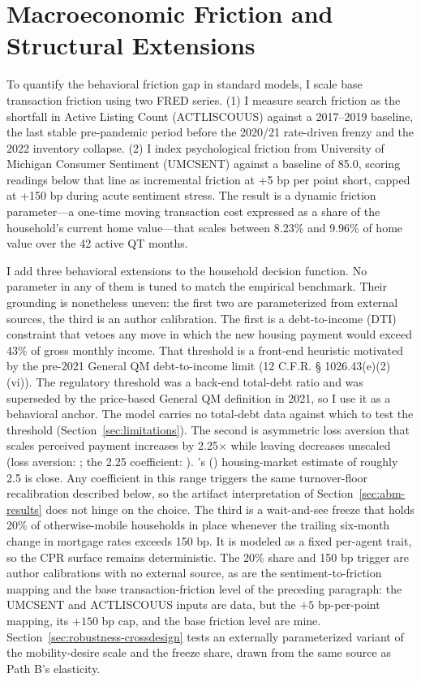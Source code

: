 \documentclass[12pt]{article}
\newcommand{\citepos}[1]{\citeauthor{#1}'s (\citeyear{#1})}
\begin{document}
\section{Macroeconomic Friction and Structural Extensions}\label{sec:method-frictions}

To quantify the behavioral friction gap in standard models, I scale base transaction friction using two FRED series. (1) I measure search friction as the shortfall in Active Listing Count (ACTLISCOUUS) against a 2017--2019 baseline, the last stable pre-pandemic period before the 2020/21 rate-driven frenzy and the 2022 inventory collapse. (2) I index psychological friction from University of Michigan Consumer Sentiment (UMCSENT) against a baseline of 85.0, scoring readings below that line as incremental friction at +5 bp per point short, capped at +150 bp during acute sentiment stress. The result is a dynamic friction parameter---a one-time moving transaction cost expressed as a share of the household's current home value---that scales between 8.23\% and 9.96\% of home value over the 42 active QT months.

I add three behavioral extensions to the household decision function. No parameter in any of them is tuned to match the empirical benchmark. Their grounding is nonetheless uneven: the first two are parameterized from external sources, the third is an author calibration. The first is a debt-to-income (DTI) constraint that vetoes any move in which the new housing payment would exceed 43\% of gross monthly income. That threshold is a front-end heuristic motivated by the pre-2021 General QM debt-to-income limit (12 C.F.R. \S{} 1026.43(e)(2)(vi)). The regulatory threshold was a back-end total-debt ratio and was superseded by the price-based General QM definition in 2021, so I use it as a behavioral anchor. The model carries no total-debt data against which to test the threshold (Section~\ref{sec:limitations}). The second is asymmetric loss aversion that scales perceived payment increases by 2.25$\times$ while leaving decreases unscaled (loss aversion: \citealp{kahneman1979}; the 2.25 coefficient: \citealp{tversky1992}). \citepos{andersen2022} housing-market estimate of roughly 2.5 is close. Any coefficient in this range triggers the same turnover-floor recalibration described below, so the artifact interpretation of Section~\ref{sec:abm-results} does not hinge on the choice. The third is a wait-and-see freeze that holds 20\% of otherwise-mobile households in place whenever the trailing six-month change in mortgage rates exceeds 150 bp. It is modeled as a fixed per-agent trait, so the CPR surface remains deterministic. The 20\% share and 150 bp trigger are author calibrations with no external source, as are the sentiment-to-friction mapping and the base transaction-friction level of the preceding paragraph: the UMCSENT and ACTLISCOUUS inputs are data, but the $+5$ bp-per-point mapping, its $+150$ bp cap, and the base friction level are mine. Section~\ref{sec:robustness-crossdesign} tests an externally parameterized variant of the mobility-desire scale and the freeze share, drawn from the same source as Path B's elasticity.
\end{document}
